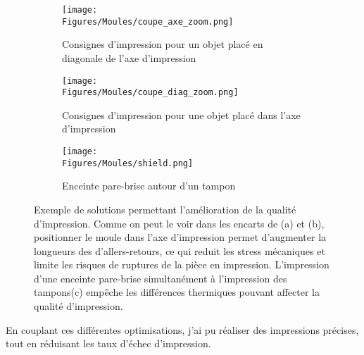 \documentclass[\main/main.tex]{subfiles}
\begin{document}
\begin{figure}[htbp]
    \centering
    \begin{subfigure}[b]{0.30\textwidth}
       \centering \caption{
            \label{fig:print:axe}
            Consignes d'impression pour un objet placé en diagonale de l'axe d'impression
            }
       \centering \texttt{[image: \\Figures/Moules/coupe\_axe\_zoom.png]}
    \end{subfigure}
    \begin{subfigure}[b]{0.30\textwidth}
       \centering \caption{
            \label{fig:print:diag}
            Consignes d'impression pour une objet placé dans l'axe d'impression
            }
       \centering \texttt{[image: \\Figures/Moules/coupe\_diag\_zoom.png]}
    \end{subfigure}
    \begin{subfigure}[b]{0.30\textwidth}
       \centering \caption{
            \label{fig:print:shield}
            Enceinte pare-brise autour d'un tampon
            }
       \centering \texttt{[image: \\Figures/Moules/shield.png]}
    \end{subfigure}
    \caption{
        \label{fig:print}
        Exemple de solutions permettant l'amélioration de la qualité d'impression.
        \newline
        Comme on peut le voir dans les encarts de (a) et (b), positionner le moule dans l'axe d'impression permet d'augmenter la longueurs des d'allers\hyp{}retours, ce qui reduit les stress mécaniques et limite les risques de ruptures de la pièce en impression.
        L'impression d'une enceinte pare-brise  simultanément à l'impression des tampons(c) empêche les différences thermiques pouvant affecter la qualité d'impression.
    }
\end{figure}

%
En couplant ces différentes optimisations, j'ai pu réaliser des impressions précises, tout en réduisant les taux d'échec d'impression.
\end{document}
